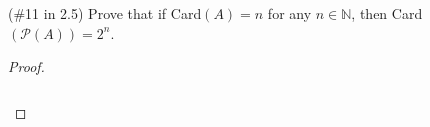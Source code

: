 (\#11 in 2.5) Prove that if Card$(A) = n$ for any $n\in \mathbb{N}$, then
Card$(\mathcal{P}(A))=2^n$.

    \begin{proof}\renewcommand{\qedsymbol}{}\ \\\\
        \begin{align*}
        \end{align*}
    \end{proof}